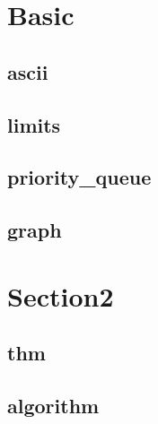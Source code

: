 \section{Basic}
    \subsection{ascii}
        
    \subsection{limits}
        
    \subsection{priority\_queue}
        
    \subsection{graph}
        

\section{Section2}
    \subsection{thm}
        
    \subsection{algorithm}
        